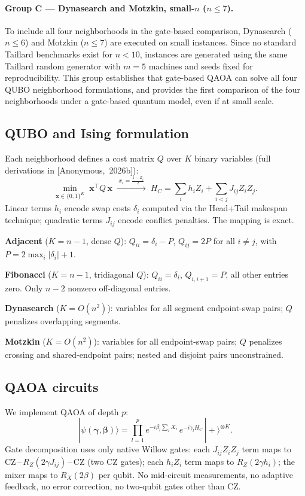 \documentclass[11pt,a4paper]{article}
\newcommand{\anonB}{[Anonymous,~2026b]}
\begin{document}
\paragraph{Group C --- Dynasearch and Motzkin, small-$n$ ($n \le 7$).}
To include all four neighborhoods in the gate-based comparison, Dynasearch
($n \le 6$) and Motzkin ($n \le 7$) are executed on small instances.
Since no standard Taillard benchmarks exist for $n < 10$, instances are
generated using the same Taillard random generator with $m = 5$ machines
and seeds fixed for reproducibility. This group establishes that
gate-based QAOA can solve all four QUBO neighborhood formulations, and
provides the first comparison of the four neighborhoods under a gate-based
quantum model, even if at small scale.

\subsection*{QUBO and Ising formulation}

Each neighborhood defines a cost matrix $Q$ over $K$ binary variables
(full derivations in \anonB{}):
\[
\min_{\mathbf{x}\in\{0,1\}^K}\;\mathbf{x}^\top Q\,\mathbf{x}
\;\xrightarrow{\;x_i = \frac{1-Z_i}{2}\;}\;
H_C = \sum_i h_i Z_i + \sum_{i<j} J_{ij} Z_i Z_j.
\]
Linear terms $h_i$ encode swap costs $\delta_i$ computed via the
Head+Tail makespan technique; quadratic terms $J_{ij}$ encode conflict
penalties. The mapping is exact.

\medskip
\noindent\textbf{Adjacent} ($K=n-1$, dense $Q$): $Q_{ii} = \delta_i - P$,
$Q_{ij} = 2P$ for all $i \neq j$, with $P = 2\max_i|\delta_i|+1$.

\noindent\textbf{Fibonacci} ($K=n-1$, tridiagonal $Q$): $Q_{ii} = \delta_i$,
$Q_{i,i+1} = P$, all other entries zero. Only $n-2$ nonzero off-diagonal
entries.

\noindent\textbf{Dynasearch} ($K=O(n^2)$): variables for all segment
endpoint-swap pairs; $Q$ penalizes overlapping segments.

\noindent\textbf{Motzkin} ($K=O(n^2)$): variables for all endpoint-swap
pairs; $Q$ penalizes crossing and shared-endpoint pairs; nested and
disjoint pairs unconstrained.

\subsection*{QAOA circuits}

We implement QAOA of depth $p$:
\[
|\psi(\boldsymbol{\gamma},\boldsymbol{\beta})\rangle =
\prod_{l=1}^{p}
e^{-i\beta_l \sum_i X_i}\,
e^{-i\gamma_l H_C}\,
|{+}\rangle^{\otimes K}.
\]
Gate decomposition uses only native Willow gates: each $J_{ij}Z_iZ_j$
term maps to CZ\,--\,$R_Z(2\gamma J_{ij})$\,--\,CZ (two CZ gates); each
$h_i Z_i$ term maps to $R_Z(2\gamma h_i)$; the mixer maps to $R_X(2\beta)$
per qubit. No mid-circuit measurements, no adaptive feedback, no error
correction, no two-qubit gates other than CZ.
\end{document}
